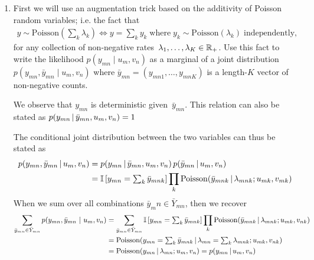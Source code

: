 \begin{enumerate}[label=(\alph*)]

\item First we will use an augmentation trick based on the additivity of Poisson random variables; i.e. the fact that
\begin{align*}
    y \sim \mathrm{Poisson}\left(\sum_k \lambda_k \right) \iff y = \sum_k y_k \; \text{where} \; y_k \sim \mathrm{Poisson}(\lambda_k) \; \text{independently},
\end{align*}
for any collection of non-negative rates~$\lambda_1, \ldots, \lambda_K \in \mathbb{R}_+$.
Use this fact to write the likelihood $p(y_{mn} \mid u_m, v_n)$ as a marginal of a joint distribution~$p(y_{mn}, \bar{y}_{mn} \mid u_m, v_n)$ 
where $\bar{y}_{mn} = (y_{mn1}, \ldots, y_{mnK})$ is a length-$K$ vector of non-negative counts.

\begin{solution}
We observe that $y_{mn}$ is deterministic given~$\bar{y}_{mn}$. This relation can also be stated as
$ p(y_{mn} \,|\, \bar{y}_{mn}, u_m, v_n) = 1 $

The conditional joint distribution between the two variables can thus be stated as
\begin{align*}
    p(y_{mn}, \bar{y}_{mn} \,|\, u_{m}, v_{n})
        &=  p(y_{mn} \,|\, \bar{y}_{mn}, u_{m}, v_{n})\,
            p(\bar{y}_{mn} \,|\, u_{m}, v_{n}) \\
        &=  \mathbb{I}\left[ y_{mn} = \textstyle\sum_k \bar{y}_{mnk} \right]
            \prod_k \mathrm{Poisson}(\bar{y}_{mnk}
                \,|\, \lambda_{mnk}; u_{mk}, v_{mk})
\end{align*}
When we sum over all combinations $\bar{y}_mn \in \bar{Y}_{mn}$, then we recover
\begin{align*}
    \sum_{\bar{y}_{mn} \in \bar{Y}_{mn}}
    p(y_{mn}, \bar{y}_{mn} ~\vert~ u_m, v_n) 
        &=  \sum_{\bar{y}_{mn} \in \bar{Y}_{mn}}
            \mathbb{I}\left[y_{mn} = \textstyle\sum_k \bar{y}_{mnk} \right]
            \prod_k \mathrm{Poisson}(\bar{y}_{mnk}
                \,|\, \lambda_{mnk}; u_{mk}, v_{nk})\\
        &= \mathrm{Poisson}(y_{mn} = \textstyle\sum_k \bar{y}_{mnk}
                \,|\, \lambda_{mn}= \textstyle\sum_k \lambda_{mnk}; u_{mk}, v_{nk}) \\
        &= \mathrm{Poisson}(y_{mn} 
                \,|\, \lambda_{mn}; u_{m}, v_{n})
            = p(y_{mn} \,|\, u_m, v_n)
\end{align*}


\end{solution}
\end{enumerate}
